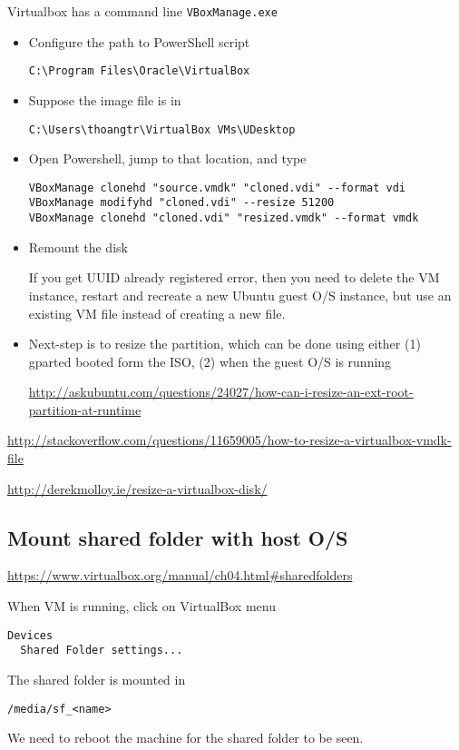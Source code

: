 Virtualbox has a command line \verb!VBoxManage.exe!
\begin{itemize}
  \item Configure the path to PowerShell script 
\begin{verbatim}
C:\Program Files\Oracle\VirtualBox
\end{verbatim}
  \item Suppose the image file is in 
\begin{verbatim}
C:\Users\thoangtr\VirtualBox VMs\UDesktop
\end{verbatim}

  \item Open Powershell, jump to that location, and type
\begin{verbatim}
VBoxManage clonehd "source.vmdk" "cloned.vdi" --format vdi
VBoxManage modifyhd "cloned.vdi" --resize 51200
VBoxManage clonehd "cloned.vdi" "resized.vmdk" --format vmdk
\end{verbatim}

  \item Remount the disk
  
If you get UUID already registered error, then you need to delete the VM
instance, restart and recreate a new Ubuntu guest O/S instance, but use an
existing VM file instead of creating a new file.

  \item Next-step is to resize the partition, which can be done using either (1)
  gparted booted form the ISO, (2) when the guest O/S is running
  
  \url{http://askubuntu.com/questions/24027/how-can-i-resize-an-ext-root-partition-at-runtime}
\end{itemize}
\url{http://stackoverflow.com/questions/11659005/how-to-resize-a-virtualbox-vmdk-file}

\url{http://derekmolloy.ie/resize-a-virtualbox-disk/}


\subsection{Mount shared folder with host O/S}

\url{https://www.virtualbox.org/manual/ch04.html\#sharedfolders}

When VM is running, click on VirtualBox menu 
\begin{verbatim}
Devices
  Shared Folder settings...
\end{verbatim}

The shared folder is mounted in
\begin{verbatim}
/media/sf_<name>
\end{verbatim}
We need to reboot the machine for the shared folder to be seen.

